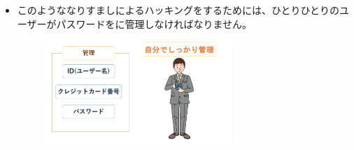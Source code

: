 \documentclass[a4paper,12pt]{jarticle}
\begin{document}
\begin{enumerate}
\begin{itemize}
\begin{figure}[h]
\begin{minipage}{5.228cm}
{                  }
              \end{minipage}
            \end{figure}
          \item
              このようななりすましによるハッキングをするためには、ひとりひとりのユーザーがパスワードをに管理しなければなりません。
          \begin{figure}[h]
          \centering
            \begin{minipage}{5.228cm}
              {\upshape
                \includegraphics[width=7.000cm]{pswd_image_imp3.pdf}
                }
            \end{minipage}
          \end{figure}
          
    
\end{itemize}



\end{enumerate}
\end{document}

